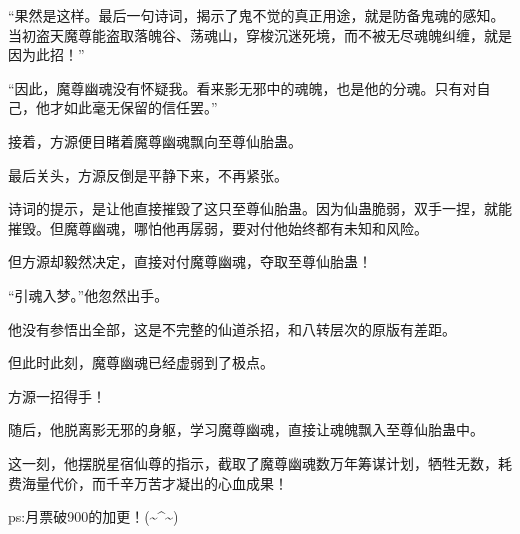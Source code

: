 \begin{this_body}
“果然是这样。最后一句诗词，揭示了鬼不觉的真正用途，就是防备鬼魂的感知。当初盗天魔尊能盗取落魄谷、荡魂山，穿梭沉迷死境，而不被无尽魂魄纠缠，就是因为此招！”

“因此，魔尊幽魂没有怀疑我。看来影无邪中的魂魄，也是他的分魂。只有对自己，他才如此毫无保留的信任罢。”

接着，方源便目睹着魔尊幽魂飘向至尊仙胎蛊。

最后关头，方源反倒是平静下来，不再紧张。

诗词的提示，是让他直接摧毁了这只至尊仙胎蛊。因为仙蛊脆弱，双手一捏，就能摧毁。但魔尊幽魂，哪怕他再孱弱，要对付他始终都有未知和风险。

但方源却毅然决定，直接对付魔尊幽魂，夺取至尊仙胎蛊！

“引魂入梦。”他忽然出手。

他没有参悟出全部，这是不完整的仙道杀招，和八转层次的原版有差距。

但此时此刻，魔尊幽魂已经虚弱到了极点。

方源一招得手！

随后，他脱离影无邪的身躯，学习魔尊幽魂，直接让魂魄飘入至尊仙胎蛊中。

这一刻，他摆脱星宿仙尊的指示，截取了魔尊幽魂数万年筹谋计划，牺牲无数，耗费海量代价，而千辛万苦才凝出的心血成果！

ps:月票破900的加更！(\~{}\^{}\~{})

\end{this_body}

